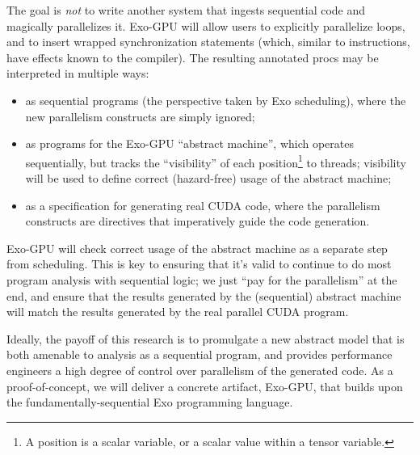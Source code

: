 \filbreak
The goal is \textit{not} to write another system that ingests sequential code and magically parallelizes it.
Exo-GPU will allow users to explicitly parallelize loops, and to insert wrapped synchronization statements (which, similar to instructions, have effects known to the compiler).
The resulting annotated procs may be interpreted in multiple ways:

\begin{itemize}
  \item as sequential programs (the perspective taken by Exo scheduling), where the new parallelism constructs are simply ignored;
  \item as programs for the Exo-GPU ``abstract machine'', which operates sequentially, but tracks the ``visibility'' of each position\footnote{A position is a scalar variable, or a scalar value within a tensor variable.} to threads;
  visibility will be used to define correct (hazard-free) usage of the abstract machine;
  \item as a specification for generating real CUDA code, where the parallelism constructs are directives that imperatively guide the code generation.
\end{itemize}

\filbreak
Exo-GPU will check correct usage of the abstract machine as a separate step from scheduling.
This is key to ensuring that it's valid to continue to do most program analysis with sequential logic; we just ``pay for the parallelism'' at the end, and ensure that the results generated by the (sequential) abstract machine will match the results generated by the real parallel CUDA program.

\filbreak
Ideally, the payoff of this research is to promulgate a new abstract model that is both amenable to analysis as a sequential program, and provides performance engineers a high degree of control over parallelism of the generated code.
As a proof-of-concept, we will deliver a concrete artifact, Exo-GPU, that builds upon the fundamentally-sequential Exo programming language.


